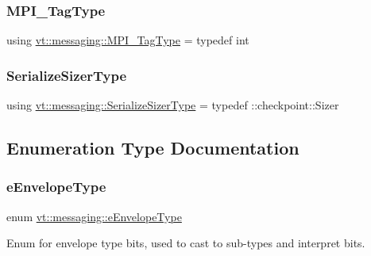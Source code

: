 \mbox{\label{namespacevt_1_1messaging_af700cb74b7b97c1a305267a9eb3ba91a}} 
\subsubsection{\texorpdfstring{M\+P\+I\+\_\+\+Tag\+Type}{MPI\_TagType}}
{\footnotesize\ttfamily using \hyperlink{namespacevt_1_1messaging_af700cb74b7b97c1a305267a9eb3ba91a}{vt\+::messaging\+::\+M\+P\+I\+\_\+\+Tag\+Type} = typedef int}

\mbox{\label{namespacevt_1_1messaging_ad46de1ccda6ed95e8bb11e85c28be878}} 
\subsubsection{\texorpdfstring{Serialize\+Sizer\+Type}{SerializeSizerType}}
{\footnotesize\ttfamily using \hyperlink{namespacevt_1_1messaging_ad46de1ccda6ed95e8bb11e85c28be878}{vt\+::messaging\+::\+Serialize\+Sizer\+Type} = typedef \+::checkpoint\+::\+Sizer}



\subsection{Enumeration Type Documentation}
\mbox{\label{namespacevt_1_1messaging_a6508ef3a4701a2e6fd0bfe3edcc63a6c}} 
\subsubsection{\texorpdfstring{e\+Envelope\+Type}{eEnvelopeType}}
{\footnotesize\ttfamily enum \hyperlink{namespacevt_1_1messaging_a6508ef3a4701a2e6fd0bfe3edcc63a6c}{vt\+::messaging\+::e\+Envelope\+Type}}



Enum for envelope type bits, used to cast to sub-\/types and interpret bits. 

